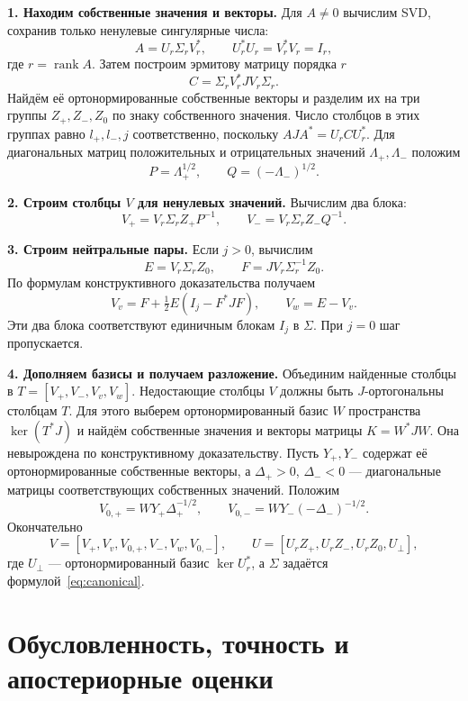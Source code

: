 \documentclass[a4paper,12pt]{article}
\DeclareMathOperator{\rank}{rank}
\theoremstyle{csstyle}
\begin{document}
\textbf{1. Находим собственные значения и векторы.}
Для $A\ne0$ вычислим SVD, сохранив только ненулевые сингулярные числа:
\[
A=U_r\Sigma_rV_r^*,\qquad U_r^*U_r=V_r^*V_r=I_r,
\]
где $r=\rank A$. Затем построим эрмитову матрицу порядка $r$
\[
C=\Sigma_rV_r^*JV_r\Sigma_r.
\]
Найдём её ортонормированные собственные векторы и разделим их
на три группы $Z_+,Z_-,Z_0$ по знаку собственного значения.
Число столбцов в этих группах равно $l_+,l_-,j$ соответственно,
поскольку $AJA^*=U_rCU_r^*$.
Для диагональных матриц положительных и отрицательных значений
$\Lambda_+,\Lambda_-$ положим
\[
P=\Lambda_+^{1/2},\qquad Q=(-\Lambda_-)^{1/2}.
\]

\textbf{2. Строим столбцы $V$ для ненулевых значений.}
Вычислим два блока:
\begin{equation}\label{eq:X}
V_+=V_r\Sigma_rZ_+P^{-1},\qquad
V_-=V_r\Sigma_rZ_-Q^{-1}.
\end{equation}

\textbf{3. Строим нейтральные пары.}
Если $j>0$, вычислим
\begin{equation}\label{eq:EF}
E=V_r\Sigma_rZ_0,\qquad F=JV_r\Sigma_r^{-1}Z_0.
\end{equation}
По формулам конструктивного доказательства получаем
\begin{equation}\label{eq:G}
V_v=F+\tfrac12E(I_j-F^*JF),\qquad V_w=E-V_v.
\end{equation}
Эти два блока соответствуют единичным блокам $I_j$ в $\Sigma$.
При $j=0$ шаг пропускается.

\textbf{4. Дополняем базисы и получаем разложение.}
Объединим найденные столбцы в $T=[V_+,V_-,V_v,V_w]$.
Недостающие столбцы $V$ должны быть $J$-ортогональны столбцам $T$.
Для этого выберем ортонормированный базис $W$ пространства $\ker(T^*J)$
и найдём собственные значения и векторы матрицы $K=W^*JW$.
Она невырождена по конструктивному доказательству.
Пусть $Y_+,Y_-$ содержат её ортонормированные собственные векторы,
а $\Delta_+>0$, $\Delta_-<0$ --- диагональные матрицы соответствующих
собственных значений. Положим
\[
V_{0,+}=WY_+\Delta_+^{-1/2},\qquad
V_{0,-}=WY_-(-\Delta_-)^{-1/2}.
\]
Окончательно
\[
V=[V_+,V_v,V_{0,+},V_-,V_w,V_{0,-}],\qquad
U=[U_rZ_+,U_rZ_-,U_rZ_0,U_\perp],
\]
где $U_\perp$ --- ортонормированный базис $\ker U_r^*$,
а $\Sigma$ задаётся формулой~\eqref{eq:canonical}.

\section{Обусловленность, точность и апостериорные оценки}
\label{sec:algorithm-analysis}
\end{document}
